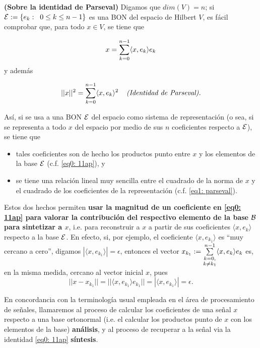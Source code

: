 \begin{nota}
\label{nota: sobre la identidad de parseval}
\textbf{(Sobre la identidad de Parseval)}
Digamos que $dim(V)=n$; si 
$\mathcal{E} := \{e_{k}: \hspace{0.2cm} 0 \leq k \leq n-1 \}$ es una
BON del espacio de Hilbert $V$, es fácil comprobar que, para todo
$x \in V$, se tiene que 

\begin{equation}
\label{eq0: 11ap}
x = \sum\limits_{k=0}^{n-1}\langle x , e_{k} \rangle e_{k}
\end{equation}
y además

\begin{equation}
\label{eq1: parseval}
|| x ||^{2} = \sum\limits_{k=0}^{n-1}\langle x , e_{k} \rangle^{2}
\hspace{0.4cm} \textit{(Identidad de Parseval).}
\end{equation}


\noindent
Así, si se usa a una BON $\mathcal{E}$ del espacio como sistema
de representación (o sea, si se representa a todo $x$ del espacio 
por medio de sus $n$ coeficientes respecto a $\mathcal{E}$), se tiene que
\begin{itemize}
	\item tales coeficientes son de hecho los productos punto entre
	$x$ y los elementos de la base $\mathcal{E}$ (c.f. 
	\eqref{eq0: 11ap}), y
	\item se tiene una relación lineal muy sencilla entre el cuadrado
	de la norma de $x$ y el cuadrado de los coeficientes de la representación
	(c.f. \eqref{eq1: parseval}).
\end{itemize}

Estos dos hechos permiten \textbf{usar la magnitud de un coeficiente en 
\eqref{eq0: 11ap} para valorar la contribución del respectivo 
elemento de la base $\mathcal{B}$ para sintetizar a $x$},
i.e. para reconstruir a $x$ a partir de sus coeficientes
$\langle x, e_{k} \rangle$ respecto a la base $\mathcal{E}$.
En efecto, si, por ejemplo, el coeficiente $\langle x, e_{k_{1}} \rangle$
es ``muy cercano a cero'', digamos 
$|\langle x, e_{k_{1}} \rangle| = \epsilon$,  
entonces el vector 
$x_{k_{1}}:= \sum\limits_{\substack{ {k=0}, \\  {k \neq k_{1}} }}^{n-1}
\langle x , e_{k} \rangle e_{k}$
es, en la misma medida, cercano al vector inicial $x$, pues
\[
|| x - x_{k_{1}} || = || \langle x , e_{k_{1}} \rangle e_{k_{1}} ||
= |\langle x , e_{k_{1}} \rangle| = \epsilon.
\]


\noindent
En concordancia con la terminología usual empleada
en el área de procesamiento de señales, 
llamaremos al proceso de calcular los coeficientes
de una señal $x$ respecto a una base ortonormal 
(i.e. el calcular los productos punto de $x$ con
los elementos de la base) \textbf{análisis}, y al proceso
de recuperar a la señal via la identidad 
\ref{eq0: 11ap} \textbf{síntesis}.
\end{nota}

